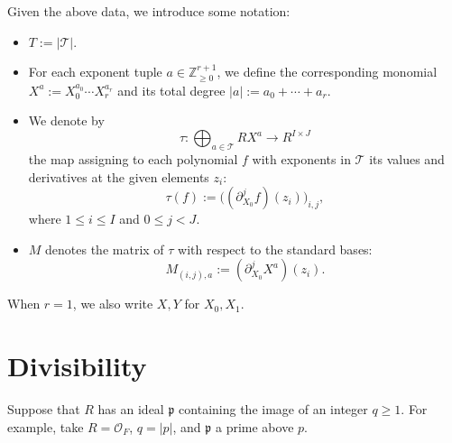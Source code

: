 \documentclass[reqno]{amsart} 
\begin{document}
Given the above data, we introduce some notation:
\begin{itemize}
\item $T := \lvert \mathcal{T} \rvert$.
\item For each exponent tuple $a \in \mathbb{Z}_{\geq 0}^{r + 1}$, we define the corresponding monomial $X^a := X_0^{a_0} \dotsb X_r^{a_r}$ and its total degree $|a| := a_0 + \dotsb + a_r$.  
\item We denote by
  \begin{equation*}
    \tau : \bigoplus_{a \in \mathcal{T}} R X^a \rightarrow R^{I \times J}
  \end{equation*}
  the map assigning to each polynomial $f$ with exponents in $\mathcal{T}$ its values and derivatives at the given elements $z_i$:
  \begin{equation*}
    \tau(f) := \bigl((\partial_{X_0}^j f)(z_i)\bigr)_{i,j},
  \end{equation*}
  where $1 \leq i \leq I$ and $0 \leq j < J$.
\item $M$ denotes the matrix of $\tau$ with respect to the standard bases:
  \begin{equation}\label{eq:cus6m1rjtg}
    M_{(i,j),a} := (\partial_{X_0}^j X^a)(z_i).
  \end{equation}

\end{itemize}
When $r = 1$, we also write $X, Y$ for $X_0, X_1$.

\section{Divisibility}\label{section:division}

Suppose that $R$ has an ideal $\mathfrak{p}$ containing the image of an integer $q \geq 1$.  For example, take $R = \mathcal{O}_F$, $q = |p|$, and $\mathfrak{p}$ a prime above $p$.
\end{document}
